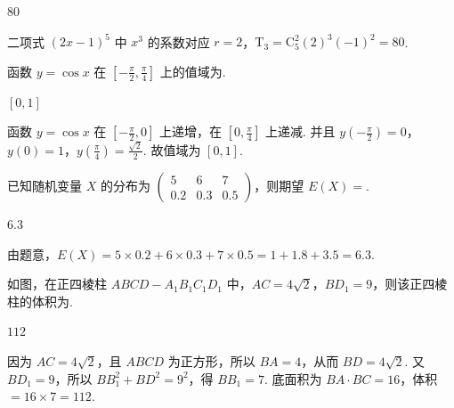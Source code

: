 \begin{answer}
\(80\)
\end{answer}

\begin{solution}
二项式 \((2x-1)^5\) 中 \(x^3\) 的系数对应 \(r=2\)，\(\mathrm{T}_{3}=\mathrm C_5^2(2)^3(-1)^2=80\).
\end{solution}

\begin{problem}
函数 \(y=\cos x\) 在 \([-\frac{\pi}{2},\frac{\pi}{4}]\) 上的值域为\fillinblank{}.
\end{problem}

\begin{answer}
\([0,1]\)
\end{answer}

\begin{solution}
函数 \(y=\cos x\) 在 \([-\frac{\pi}{2},0]\) 上递增，在 \([0,\frac{\pi}{4}]\) 上递减. 并且 \(y(-\frac{\pi}{2})=0\)，\(y(0)=1\)，\(y(\frac{\pi}{4})=\frac{\sqrt2}{2}\). 故值域为 \([0,1]\).
\end{solution}

\begin{problem}
已知随机变量 \(X\) 的分布为
\(\begin{pmatrix}5&6&7\\0.2&0.3&0.5\end{pmatrix}\)，则期望 \(E(X)=\)\fillinblank{}.
\end{problem}

\begin{answer}
\(6.3\)
\end{answer}

\begin{solution}
由题意，\(E(X)=5\times0.2+6\times0.3+7\times0.5=1+1.8+3.5=6.3\).
\end{solution}

\begin{problem}
如图，在正四棱柱 \(ABCD-A_1B_1C_1D_1\) 中，\(AC=4\sqrt2\)，\(BD_1=9\)，则该正四棱柱的体积为\fillinblank{}.

\end{problem}

\begin{answer}
\(112\)
\end{answer}

\begin{solution}
因为 \(AC=4\sqrt2\)，且 \(ABCD\) 为正方形，所以 \(BA=4\)，从而 \(BD=4\sqrt2\). 又 \(BD_1=9\)，所以 \(BB_1^2+BD^2=9^2\)，得 \(BB_1=7\). 底面积为 \(BA\cdot BC=16\)，体积 \(=16\times7=112\).
\end{solution}

